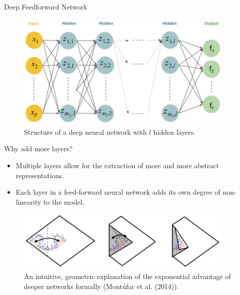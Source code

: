 
\begin{vbframe}{Deep Feedforward Network}
  \lz
  \begin{figure}
    \centering
      \includegraphics[width=10.5cm]{../plots/deepneuralnet_new.png}
      \caption{Structure of a deep neural network with $l$ hidden layers.}
  \end{figure}
\end{vbframe}  

\begin{vbframe}{Why add more layers?}
\begin{itemize}
\item Multiple layers allow for the extraction of more and more abstract
representations.
\lz
\item Each layer in a feed-forward neural network adds its own degree of non-linearity to the model.
\end{itemize}
\lz
\begin{figure}
\centering
\includegraphics[width=10.5cm]{../plots/folding}
\caption{An intuitive, geometric explanation of the exponential advantage of deeper networks formally (Mont\'{u}far et al. (2014)).}
\end{figure}
\end{vbframe}

